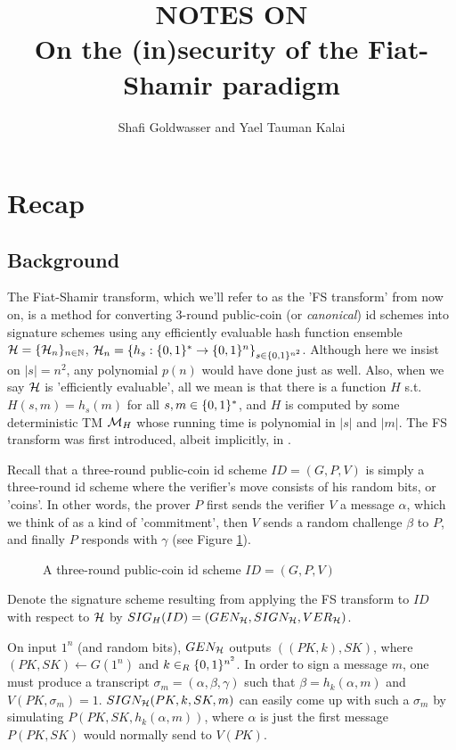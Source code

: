 \documentclass[12pt,twoside]{article}
\title{NOTES ON\\ On the (in)security of the Fiat-Shamir paradigm}
\author{Shafi Goldwasser and Yael Tauman Kalai}
\begin{document}
\maketitle

\section{Recap}
\subsection{Background}
The Fiat-Shamir transform, which we'll refer to as the 'FS transform' 
from now on, is a method for converting 3-round public-coin (or {\it
canonical}) id schemes into signature schemes using any efficiently
evaluable hash function ensemble $\fanh = \ens{\fanh}{n}$, $\fanh_n = 
\{\func{h_s}{\strs{*}}{\strs{n}} \}_{s \in \strs{n^2}}$. Although here we 
insist on $|s| = n^2$, any polynomial $p(n)$ would have done just as well. 
Also, when we say $\fanh$ is 'efficiently evaluable', all we mean is that 
there is a function $H$ s.t. $H(s,m) = h_s(m)$ for all $s,m \in \strs{*}$, 
and $H$ is computed by some deterministic TM $\fanm_H$ whose running time is 
polynomial in $|s|$ and $|m|$. The FS transform was first introduced, albeit 
implicitly, in \cite{fiat:fsparadigm}. 

Recall that a three-round public-coin id scheme $ID = (G,P,V)$ is simply a 
three-round id scheme where the verifier's move consists of his random bits, 
or 'coins'. In other words, the prover $P$ first sends the verifier $V$ a 
message $\alpha$, which we think of as a kind of 'commitment', then $V$ sends 
a random challenge $\beta$ to $P$, and finally $P$ responds with $\gamma$ 
(see Figure \ref{fig:threerounds}). 
\begin{figure}[h]
\begin{center}

\caption{A three-round public-coin id scheme $ID = (G,P,V)$}
\label{fig:threerounds}
\end{center}
\end{figure}

\noindent
Denote the signature scheme resulting 
from applying the FS transform to $ID$ with respect to $\fanh$ by 
$\fs{ID}{H} = (GEN_\fanh,SIGN_\fanh,VER_\fanh)$. 

On input $1^n$ (and random bits), 
$GEN_\fanh$ outputs $((PK,k),SK)$, where $(PK,SK) \gets G(1^n)$ and $k \in_R
\strs{n^2}$. In order to sign a message $m$, one must produce a transcript
$\sigma_m = (\alpha,\beta,\gamma)$ such that $\beta = h_k(\alpha,m)$ and
$V(PK,\sigma_m) = 1$. $SIGN_\fanh(PK,k,SK,m)$ can easily come up with such a
$\sigma_m$ by simulating $P(PK,SK,h_k(\alpha,m))$, where $\alpha$ is just the
first message $P(PK,SK)$ would normally send to $V(PK)$. 
\end{document}
